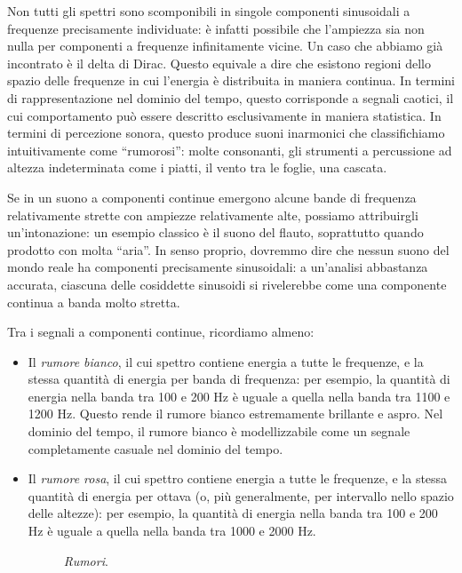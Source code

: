 Non tutti gli spettri sono scomponibili in singole componenti sinusoidali a frequenze precisamente individuate: è infatti possibile che l'ampiezza sia non nulla per componenti a frequenze infinitamente vicine. Un caso che abbiamo già incontrato è il delta di Dirac. Questo equivale a dire che esistono regioni dello spazio delle frequenze in cui l'energia è distribuita in maniera continua. In termini di rappresentazione nel dominio del tempo, questo corrisponde a segnali caotici, il cui comportamento può essere descritto esclusivamente in maniera statistica. In termini di percezione sonora, questo produce suoni inarmonici che classifichiamo intuitivamente come ``rumorosi'': molte consonanti, gli strumenti a percussione ad altezza indeterminata come i piatti, il vento tra le foglie, una cascata.

Se in un suono a componenti continue emergono alcune bande di frequenza relativamente strette con ampiezze relativamente alte, possiamo attribuirgli un'intonazione: un esempio classico è il suono del flauto, soprattutto quando prodotto con molta ``aria''. In senso proprio, dovremmo dire che nessun suono del mondo reale ha componenti precisamente sinusoidali: a un'analisi abbastanza accurata, ciascuna delle cosiddette sinusoidi si rivelerebbe come una componente continua a banda molto stretta.

Tra i segnali a componenti continue, ricordiamo almeno:

\begin{itemize}

\item Il \emph{rumore bianco}, il cui spettro contiene energia a tutte le frequenze, e la stessa quantità di energia per banda di frequenza: per esempio, la quantità di energia nella banda tra 100 e 200 Hz è uguale a quella nella banda tra 1100 e 1200 Hz. Questo rende il rumore bianco estremamente brillante e aspro. Nel dominio del tempo, il rumore bianco è modellizzabile come un segnale completamente casuale nel dominio del tempo.

\item Il \emph{rumore rosa}, il cui spettro contiene energia a tutte le frequenze, e la stessa quantità di energia per ottava (o, più generalmente, per intervallo nello spazio delle altezze): per esempio, la quantità di energia nella banda tra 100 e 200 Hz è uguale a quella nella banda tra 1000 e 2000 Hz. 

\begin{figure}
    \begin{center}
       \scalebox{0.6} {}
    \end{center}
    \caption{\emph{Rumori}.}
\end{figure}

\end{itemize}



